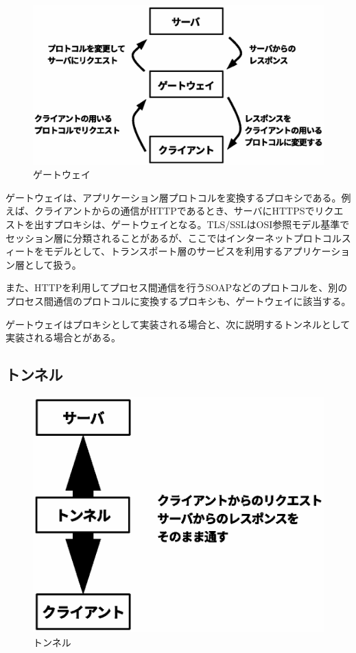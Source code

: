 \begin{figure}[htbp]
	\includegraphics[width=12cm,clip]{draw/fig4.eps}
	\caption{ゲートウェイ}
	\label{fig:gateway}
\end{figure}

ゲートウェイは、アプリケーション層プロトコルを変換するプロキシである。例えば、クライアントからの通信がHTTPであるとき、サーバにHTTPSでリクエストを出すプロキシは、ゲートウェイとなる。TLS/SSLはOSI参照モデル基準でセッション層に分類されることがあるが、ここではインターネットプロトコルスィートをモデルとして、トランスポート層のサービスを利用するアプリケーション層として扱う。

また、HTTPを利用してプロセス間通信を行うSOAPなどのプロトコルを、別のプロセス間通信のプロトコルに変換するプロキシも、ゲートウェイに該当する。

ゲートウェイはプロキシとして実装される場合と、次に説明するトンネルとして実装される場合とがある。

\subsection{トンネル}

\begin{figure}[htbp]
	\includegraphics[width=12cm,clip]{draw/fig5.eps}
	\caption{トンネル}
	\label{fig:tunnel}
\end{figure}


